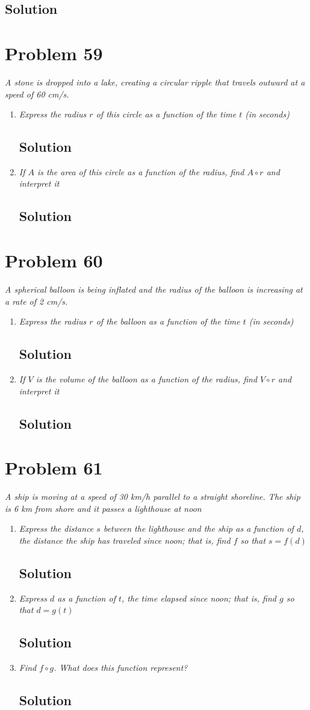 \documentclass[11pt]{article}
\newcommand{\soln}{\subsection*}
\newcommand{\qn}{\textit}
\begin{document}
\soln{Solution}

\section*{Problem 59}

\qn{A stone is dropped into a lake, creating a circular ripple that travels outward at a speed of 60 cm/s.}

\begin{enumerate}
	\item \qn{Express the radius $r$ of this circle as a function of the time $t$ (in seconds)}
	\soln{Solution}
	
	\item \qn{If $A$ is the area of this circle as a function of the radius, find $A \circ r$ and interpret it}
	\soln{Solution}
\end{enumerate}

\section*{Problem 60}

\qn{A spherical balloon is being inflated and the radius of the balloon is increasing at a rate of 2 cm/s.}

\begin{enumerate}
	\item \qn{Express the radius $r$ of the balloon as a function of the time $t$ (in seconds)}
	\soln{Solution}
	
	\item \qn{If $V$ is the volume of the balloon as a function of the radius, find $V \circ r$ and interpret it}
	\soln{Solution}
\end{enumerate}

\section*{Problem 61}

\qn{A ship is moving at a speed of 30 km/h parallel to a straight shoreline. The ship is 6 km from shore and it passes a lighthouse at noon }

\begin{enumerate}
	\item \qn{Express the distance $s$ between the lighthouse and the ship as a function of $d$, the distance the ship has traveled since noon; that is, find $f$ so that $s=f(d)$}
	\soln{Solution}
	
	\item \qn{Express $d$ as a function of $t$, the time elapsed since noon; that is, find $g$ so that $d=g(t)$}
	\soln{Solution}
	
	\item \qn{Find $f \circ g$. What does this function represent?}
	\soln{Solution}
\end{enumerate}
\end{document}
